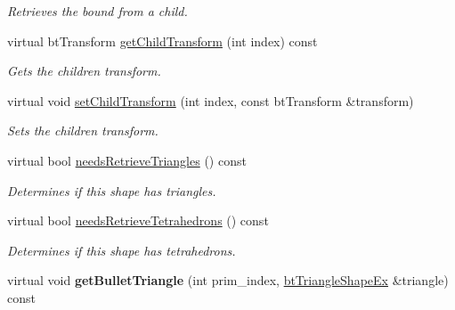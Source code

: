 \begin{DoxyCompactItemize}
\begin{DoxyCompactList}\small\item\em Retrieves the bound from a child. \end{DoxyCompactList}\item 
\hypertarget{classbt_g_impact_compound_shape_a9fa7a1a4793231951d76ad9cb7e13f40}{virtual bt\+Transform \hyperlink{classbt_g_impact_compound_shape_a9fa7a1a4793231951d76ad9cb7e13f40}{get\+Child\+Transform} (int index) const }\label{classbt_g_impact_compound_shape_a9fa7a1a4793231951d76ad9cb7e13f40}

\begin{DoxyCompactList}\small\item\em Gets the children transform. \end{DoxyCompactList}\item 
virtual void \hyperlink{classbt_g_impact_compound_shape_a560410e20842ad73227d7712a574385c}{set\+Child\+Transform} (int index, const bt\+Transform \&transform)
\begin{DoxyCompactList}\small\item\em Sets the children transform. \end{DoxyCompactList}\item 
\hypertarget{classbt_g_impact_compound_shape_a41a26228c6b7e9125a9fe1d7725b3e83}{virtual bool \hyperlink{classbt_g_impact_compound_shape_a41a26228c6b7e9125a9fe1d7725b3e83}{needs\+Retrieve\+Triangles} () const }\label{classbt_g_impact_compound_shape_a41a26228c6b7e9125a9fe1d7725b3e83}

\begin{DoxyCompactList}\small\item\em Determines if this shape has triangles. \end{DoxyCompactList}\item 
\hypertarget{classbt_g_impact_compound_shape_acc105ecae2f0c117f861aa939c978748}{virtual bool \hyperlink{classbt_g_impact_compound_shape_acc105ecae2f0c117f861aa939c978748}{needs\+Retrieve\+Tetrahedrons} () const }\label{classbt_g_impact_compound_shape_acc105ecae2f0c117f861aa939c978748}

\begin{DoxyCompactList}\small\item\em Determines if this shape has tetrahedrons. \end{DoxyCompactList}\item 
\hypertarget{classbt_g_impact_compound_shape_a73f11c1cd839e8be1b0ab5f6cad7c13c}{virtual void {\bfseries get\+Bullet\+Triangle} (int prim\+\_\+index, \hyperlink{classbt_triangle_shape_ex}{bt\+Triangle\+Shape\+Ex} \&triangle) const }\label{classbt_g_impact_compound_shape_a73f11c1cd839e8be1b0ab5f6cad7c13c}


\end{DoxyCompactItemize}
